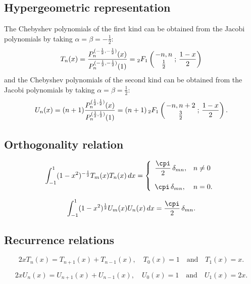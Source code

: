 \documentclass[envcountchap,graybox]{svmono}
\newcounter{rom}
\newcommand{\hyp}[5]{\mbox{}_{#1}{F}_{#2}
\left(\genfrac{}{}{0pt}{}{#3}{#4}\,;\,#5\right)}
\begin{document}
\subsection*{Hypergeometric representation}
The Chebyshev polynomials of the first kind can be obtained from the Jacobi
polynomials by taking $\alpha=\beta=-\frac{1}{2}$:
\begin{equation}
\label{DefChebyshevI}
T_n(x)=\frac{P_n^{(-\frac{1}{2},-\frac{1}{2})}(x)}{P_n^{(-\frac{1}{2},-\frac{1}{2})}(1)}
=\hyp{2}{1}{-n,n}{\frac{1}{2}}{\frac{1-x}{2}}
\end{equation}
and the Chebyshev polynomials of the second kind can be obtained from the
Jacobi polynomials by taking $\alpha=\beta=\frac{1}{2}$:
\begin{equation}
\label{DefChebyshevII}
U_n(x)=(n+1)\frac{P_n^{(\frac{1}{2},\frac{1}{2})}(x)}{P_n^{(\frac{1}{2},\frac{1}{2})}(1)}
=(n+1)\,\hyp{2}{1}{-n,n+2}{\frac{3}{2}}{\frac{1-x}{2}}.
\end{equation}

\subsection*{Orthogonality relation}
\begin{equation}
\label{OrtChebyshevI}
\int_{-1}^1(1-x^2)^{-\frac{1}{2}}T_m(x)T_n(x)\,dx=
\left\{\begin{array}{ll}
\displaystyle\frac{\cpi}{2}\,\delta_{mn}, & n\neq 0\\[5mm]
\cpi\,\delta_{mn}, & n=0.
\end{array}\right.
\end{equation}

\begin{equation}
\label{OrtChebyshevII}
\int_{-1}^1(1-x^2)^{\frac{1}{2}}U_m(x)U_n(x)\,dx=\frac{\cpi}{2}\,\delta_{mn}.
\end{equation}

\subsection*{Recurrence relations}
\begin{equation}
\label{RecChebyshevI}
2xT_n(x)=T_{n+1}(x)+T_{n-1}(x),\quad T_{0}(x)=1\quad\textrm{and}\quad T_1(x)=x.
\end{equation}

\begin{equation}
\label{RecChebyshevII}
2xU_n(x)=U_{n+1}(x)+U_{n-1}(x),\quad U_{0}(x)=1\quad\textrm{and}\quad U_1(x)=2x.
\end{equation}
\end{document}
